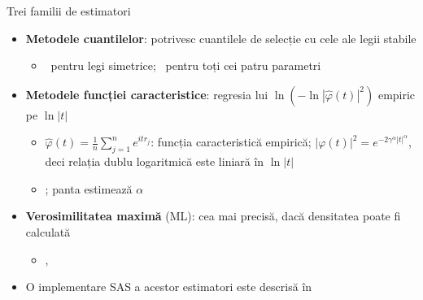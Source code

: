 \begin{frame}{Trei familii de estimatori}
\itemsize{\small}
\begin{itemize}
    \item \textbf{Metodele cuantilelor}: potrivesc cuantilele de selecție cu cele ale legii stabile
    \begin{itemize}
        \item {}\ pentru legi simetrice; \ pentru toți cei patru parametri
    \end{itemize}
    \item \textbf{Metodele funcției caracteristice}: regresia lui $\ln(-\ln|\hat\varphi(t)|^2)$ empiric pe $\ln|t|$
    \begin{itemize}
        \item $\hat\varphi(t) = \frac1n\sum_{j=1}^n e^{itr_j}$: funcția caracteristică empirică; $|\varphi(t)|^2 = e^{-2\gamma^\alpha|t|^\alpha}$, deci relația dublu logaritmică este liniară în $\ln|t|$
        \item {}; panta estimează $\alpha$
    \end{itemize}
    \item \textbf{Verosimilitatea maximă} (ML): cea mai precisă, dacă densitatea poate fi calculată
    \begin{itemize}
        \item {}, 
    \end{itemize}
    \item O implementare SAS a acestor estimatori este descrisă în 
\end{itemize}
\end{frame}

